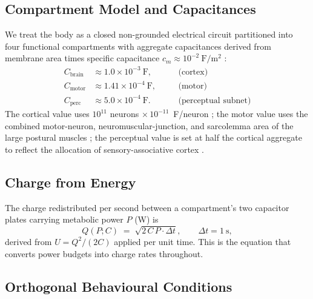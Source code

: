 \documentclass[11pt,twocolumn,a4paper]{article}
\theoremstyle{definition}
\theoremstyle{remark}
\newcommand{\Cbrain}{C_{\mathrm{brain}}}
\newcommand{\Cmotor}{C_{\mathrm{motor}}}
\newcommand{\Cperc}{C_{\mathrm{perc}}}
\begin{document}
\subsection{Compartment Model and Capacitances}

We treat the body as a closed non-grounded electrical circuit
\citep{hodgkin1952} partitioned into four functional compartments
with aggregate capacitances derived from membrane area times specific
capacitance $c_m\!\approx\!10^{-2}~\mathrm{F/m^2}$
\citep{gentet2000,cole1941}:
\begin{align}
\Cbrain &\approx 1.0\times 10^{-3}~\mathrm{F},\quad &&\text{(cortex)} \\
\Cmotor &\approx 1.41\times 10^{-4}~\mathrm{F},\quad &&\text{(motor)} \\
\Cperc &\approx 5.0\times 10^{-4}~\mathrm{F}. &&\text{(perceptual subnet)}
\end{align}
The cortical value uses $10^{11}$ neurons $\times\,10^{-11}$~F/neuron
\citep{kandel2013,attwell2001}; the motor value uses the combined
motor-neuron, neuromuscular-junction, and sarcolemma area of the
large postural muscles \citep{purves2018}; the perceptual value is
set at half the cortical aggregate to reflect the allocation of
sensory-associative cortex \citep{zeki1993,koch2004}.

\subsection{Charge from Energy}

The charge redistributed per second between a compartment's two
capacitor plates carrying metabolic power $P$ (W) is
\begin{equation}
Q(P;C) \;=\; \sqrt{2\,C\,P\cdot\Delta t},\qquad \Delta t = 1~\mathrm{s},
\label{eq:QfromU}
\end{equation}
derived from $U = Q^2/(2C)$ applied per unit time. This is the
equation that converts power budgets into charge rates throughout.

\subsection{Orthogonal Behavioural Conditions}
\end{document}
